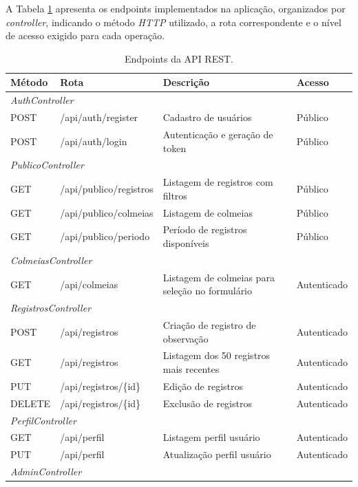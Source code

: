 \documentclass[12pt]{unisenaiclass}
\begin{document}
A Tabela \ref{tab:endpoints} apresenta os endpoints implementados na aplicação, organizados por \textit{controller}, indicando o método \textit{HTTP} utilizado, a rota correspondente e o nível de acesso exigido para cada operação.

\renewcommand{\arraystretch}{1.0}

\begin{longtable}{llp{5cm}l}
\caption{Endpoints da API REST.}
\label{tab:endpoints}\\

\hline
\textbf{Método} & \textbf{Rota} & \textbf{Descrição} & \textbf{Acesso} \\
\hline
\multicolumn{4}{l}{\textit{AuthController}} \\
\hline
POST & /api/auth/register & Cadastro de usuários & Público \\
POST & /api/auth/login    & Autenticação e geração de token & Público \\
\hline
\multicolumn{4}{l}{\textit{PublicoController}} \\
\hline
GET & /api/publico/registros & Listagem de registros com filtros & Público \\
GET & /api/publico/colmeias  & Listagem de colmeias & Público \\
GET & /api/publico/periodo   & Período de registros disponíveis & Público \\
\hline
\multicolumn{4}{l}{\textit{ColmeiasController}} \\
\hline
GET & /api/colmeias & Listagem de colmeias para seleção no formulário & Autenticado \\
\hline
\multicolumn{4}{l}{\textit{RegistrosController}} \\
\hline
POST   & /api/registros      & Criação de registro de observação & Autenticado \\
GET    & /api/registros      & Listagem dos 50 registros mais recentes & Autenticado \\
PUT    & /api/registros/\{id\} & Edição de registros & Autenticado \\
DELETE & /api/registros/\{id\} & Exclusão de registros & Autenticado \\
\hline
\multicolumn{4}{l}{\textit{PerfilController}} \\
\hline
GET & /api/perfil & Listagem perfil usuário & Autenticado \\
PUT & /api/perfil & Atualização perfil usuário & Autenticado \\
\hline
\multicolumn{4}{l}{\textit{AdminController}} \\

\end{longtable}
\end{document}
